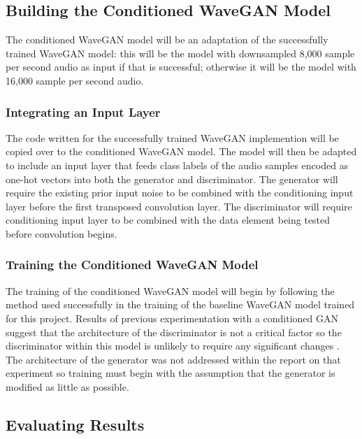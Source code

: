 \documentclass[a4paper, dvipsnames, titlepage]{article}
\begin{document}
\subsection{Building the Conditioned WaveGAN Model}

The conditioned WaveGAN model will be an adaptation of the successfully trained WaveGAN model: this will be the model with downsampled 8,000 sample per second audio as input if that is successful; otherwise it will be the model with 16,000 sample per second audio.

\subsubsection{Integrating an Input Layer}

The code written for the successfully trained WaveGAN implemention will be copied over to the conditioned WaveGAN model.
The model will then be adapted to include an input layer that feeds class labels of the audio samples encoded as one-hot vectors into both the generator and discriminator.
The generator will require the existing prior input noise to be combined with the conditioning input layer before the first transposed convolution layer.
The discriminator will require conditioning input layer to be combined with the data element being tested before convolution begins.

\subsubsection{Training the Conditioned WaveGAN Model}

The training of the conditioned WaveGAN model will begin by following the method used successfully in the training of the baseline WaveGAN model trained for this project.
Results of previous experimentation with a conditioned GAN suggest that the architecture of the discriminator is not a critical factor so the discriminator within this model is unlikely to require any significant changes \citep{2014arXiv1411.1784M}.
The architecture of the generator was not addressed within the report on that experiment so training must begin with the assumption that the generator is modified as little as possible.

\subsection{Evaluating Results}
\end{document}
